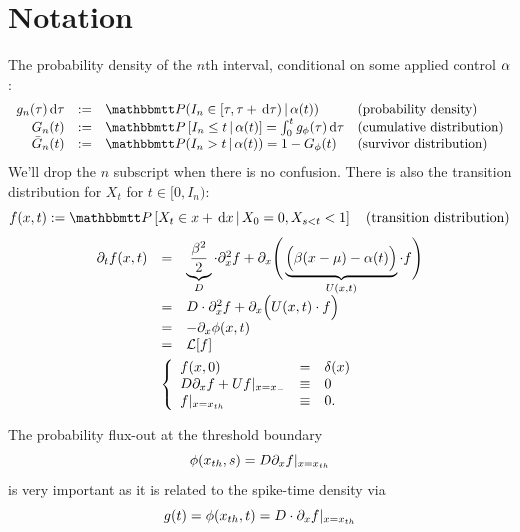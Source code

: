 \section{Notation}
The probability density of the $n$th interval,
conditional on some applied control $\alpha$:
\begin{equation} 
\begin{array}{rcll} 
g_n(\t) \intd{\t} &:=& \Prob(I_{n} \in [\t, \t + \intd{\t})  \,|\,
 \a(t)) &
 \textrm{(probability density)} 
\\ 
G_{n}(t) &:=& \Prob \left[I_{n} \leq t  \,|\,
 \a(t) \right] = \int_0^t g_{\phi}(\t) \intd{\t} &
 \textrm{(cumulative distribution)}
\\
\G_{n}(t) &:= & \Prob(I_{n}>t \,|\, \a(t) ) = 1 - G_{\phi}(t)
&
 \textrm{(survivor distribution)}
\end{array}
\label{eq:ISI_distribution_functions}
\end{equation}
We'll drop the $n$ subscript when there is no confusion. 
There is also the transition distribution for $X_t$ for $t \in [0,
I_{n})$:
\begin{equation}
f(x,t) := \Prob \left[X_{t} \in x+ \intd{x}  \,|\,
 X_0 = 0, X_{s < t} < 1  \right]  \quad
 \textrm{(transition distribution)}
 \label{eq:transition_distribution}
\end{equation} 
\begin{equation}
\begin{gathered}
\begin{array}{lcl}
	{\partial}_t f (x,t) &=&
					\underbrace{\frac{\beta^2 }{2}}_{D}\cdot {\partial}^2_x f 
					+ {\partial}_x \Bigg(  
					\underbrace{\Big( \beta (x-{\mu }) - \alpha(t) \Big)}_{U(x,t)}  \cdot  f \Bigg)
					\\
					&=&
					D \cdot {\partial}^2_x f +
					{\partial}_x  \Big( U(x,t) \cdot f \Big)
					\\
					&=&
					- {\partial}_x \phi(x,t)
					\\
					&=&
					{ \mathcal{L} }[f] 
					\end{array}
	\\
	\left\{ \begin{array}{lcl}
	 f (x,0) &=& \delta(x)
	\\
	D {\partial}_xf + U f |_{x={ x_{-} }} &\equiv& 0 
	\\
	f |_{x={ x_{th} }} &\equiv& 0.
	\end{array} \right.
\label{eq:FP_pde_OU_absorbBC_CDF}
\end{gathered}
\end{equation}

The probability flux-out at the threshold boundary $$\phi({ x_{th} }, s) = D
{\partial}_xf |_{x={ x_{th} }}$$ is very important as it is related to the spike-time density
via $$g( t)  = \phi({ x_{th} }, t) = D\cdot {\partial}_x f|_{x={ x_{th} }}$$
 
